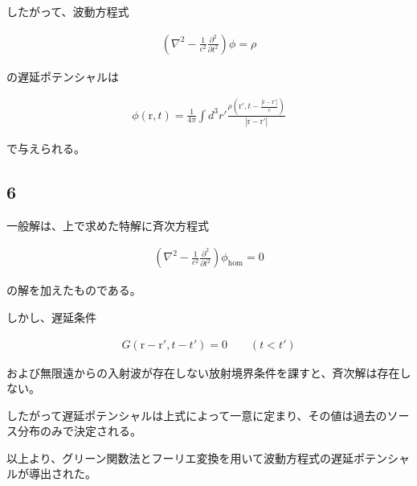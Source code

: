 \documentclass[platex,dvipdfmx,a4paper]{jsarticle}
\newcommand{\vect}[1]{\boldsymbol{\mathrm{#1}}}
\begin{document}
したがって、波動方程式

\begin{align*}
\left(
\nabla^2-\frac{1}{c^2}\frac{\partial^2}{\partial t^2}
\right)\phi
=
\rho
\end{align*}

の遅延ポテンシャルは

\begin{align*}
\phi(\vect r,t)
=
\frac{1}{4\pi}
\int d^3r'
\frac{
\rho\!\left(
\vect r',
t-\frac{|\vect r-\vect r'|}{c}
\right)
}
{|\vect r-\vect r'|}
\end{align*}

で与えられる。

\subsection*{6}

一般解は、上で求めた特解に斉次方程式

\begin{align*}
\left(
\nabla^2-\frac{1}{c^2}\frac{\partial^2}{\partial t^2}
\right)\phi_{\mathrm{hom}}
=
0
\end{align*}

の解を加えたものである。

しかし、遅延条件

\begin{align*}
G(\vect r-\vect r',t-t')
=
0
\qquad
(t<t')
\end{align*}

および無限遠からの入射波が存在しない放射境界条件を課すと、斉次解は存在しない。

したがって遅延ポテンシャルは上式によって一意に定まり、その値は過去のソース分布のみで決定される。

以上より、グリーン関数法とフーリエ変換を用いて波動方程式の遅延ポテンシャルが導出された。
\end{document}
